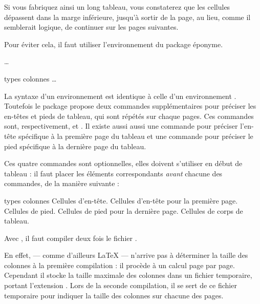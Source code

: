 Si vous fabriquez ainsi un long tableau, vous constaterez que les cellules dépassent dans la marge inférieure, jusqu'à sortir de la page, au lieu, comme il semblerait logique, de continuer sur les pages suivantes.

Pour éviter cela, il faut  utiliser l'environnement  du package éponyme.

\begin{latexcode}
\usepackage{longtable}
…
\begin{longtable}{types colonnes}
…
\end{longtable}
\end{latexcode}

La syntaxe d'un environnement  est identique à celle d'un environnement . Toutefois le package propose deux  commandes supplémentaires pour préciser les en-têtes et pieds de tableau, qui sont répétés sur chaque pages. Ces commandes sont, respectivement,  et . Il existe aussi aussi une commande  pour préciser l'en-tête  spécifique à la première page du tableau et une commande  pour préciser le pied  spécifique à la dernière page du tableau.

Ces quatre commandes sont optionnelles, elles  doivent s'utiliser en début de tableau : il faut placer les éléments correspondants \emph{avant} chacune des commandes, de la manière suivante :

\begin{latexcode}
\begin{longtable}{types colonnes}
Cellules d'en-tête.
\endhead
Cellules d'en-tête pour la première page.
\endfirsthead
Cellules de pied.
\endfoot
Cellules de pied pour la dernière page.
\endlastfoot
Cellules de corps de tableau.
\end{longtable}
\end{latexcode}

\begin{attention}
Avec , il faut compiler deux fois le fichier . 

En effet, \XeLaTeX{} --- comme d'ailleurs \LaTeX{} --- n'arrive pas à déterminer la taille des colonnes à la première compilation : il procède à un calcul page par page. Cependant il stocke la taille maximale des colonnes dans un fichier temporaire, portant l'extension . Lors de la seconde compilation, il se sert de ce fichier temporaire pour indiquer la taille des colonnes sur chacune des pages.
\end{attention}


